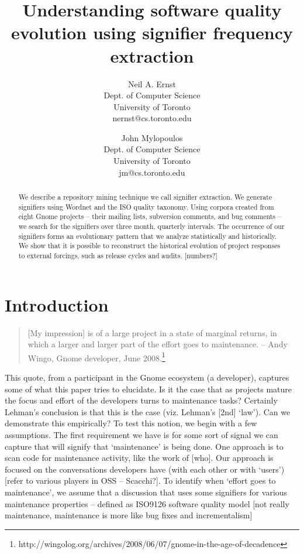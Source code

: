\documentclass[conference, compsoc]{IEEEtran}
\begin{document}

 
\title{Understanding software quality evolution using signifier frequency extraction}
\author{
Neil A. Ernst\\Dept. of Computer Science\\University of Toronto\\nernst@cs.toronto.edu \and
John Mylopoulos\\Dept. of Computer Science\\University of Toronto\\jm@cs.toronto.edu }

\maketitle

\begin{abstract}
We describe a repository mining technique we call signifier extraction. We generate signifiers using Wordnet and the ISO quality taxonomy. Using corpora created from eight Gnome projects -- their mailing lists, subversion comments, and bug comments -- we search for the signifiers over three month, quarterly intervals. The occurrence of our signifiers forms an evolutionary pattern that we analyze statistically and historically. We show that it is possible to reconstruct the historical evolution of project responses to external forcings, such as release cycles and audits. [numbers?]
\end{abstract}

\section{Introduction}\label{sect:introduction}%
\begin{quote}[My impression] is of a large project in a state of marginal returns, in which a larger and larger part of the effort goes to maintenance. -- Andy Wingo, Gnome developer, June 2008.\footnote{http://wingolog.org/archives/2008/06/07/gnome-in-the-age-of-decadence}\end{quote}
	This quote, from a participant in the Gnome ecosystem (a developer), captures some of what this paper tries to elucidate. Is it the case that as projects mature the focus and effort of the developers turns to maintenance tasks\cite{Swanson1976}? Certainly Lehman's conclusion \cite{Lehman1985} is that this is the case (viz. Lehman's [2nd] `law'). Can we demonstrate this empirically? To test this notion, we begin with a few assumptions. The first requirement we have is for some sort of signal we can capture that will signify that `maintenance' is being done. One approach is to scan code for maintenance activity, like the work of [who]. Our approach is focused on the conversations developers have (with each other or with `users') [refer to various players in OSS -- Scacchi?]. To identify when `effort goes to maintenance', we assume that a discussion that uses some signifiers for various maintenance properties -- defined as ISO9126 software quality model [not really maintenance, maintenance is more like bug fixes and incrementalism]
	
\end{document}
